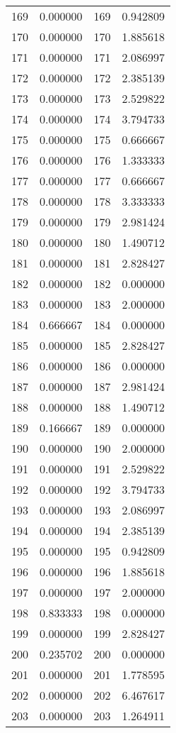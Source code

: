 \documentclass[12pt]{article}
\begin{document}
\begin{longtable}{@{}cccc@{}}
169 & 0.000000 & 169 & 0.942809 \\
170 & 0.000000 & 170 & 1.885618 \\
171 & 0.000000 & 171 & 2.086997 \\
172 & 0.000000 & 172 & 2.385139 \\
173 & 0.000000 & 173 & 2.529822 \\
174 & 0.000000 & 174 & 3.794733 \\
175 & 0.000000 & 175 & 0.666667 \\
176 & 0.000000 & 176 & 1.333333 \\
177 & 0.000000 & 177 & 0.666667 \\
178 & 0.000000 & 178 & 3.333333 \\
179 & 0.000000 & 179 & 2.981424 \\
180 & 0.000000 & 180 & 1.490712 \\
181 & 0.000000 & 181 & 2.828427 \\
182 & 0.000000 & 182 & 0.000000 \\
183 & 0.000000 & 183 & 2.000000 \\
184 & 0.666667 & 184 & 0.000000 \\
185 & 0.000000 & 185 & 2.828427 \\
186 & 0.000000 & 186 & 0.000000 \\
187 & 0.000000 & 187 & 2.981424 \\
188 & 0.000000 & 188 & 1.490712 \\
189 & 0.166667 & 189 & 0.000000 \\
190 & 0.000000 & 190 & 2.000000 \\
191 & 0.000000 & 191 & 2.529822 \\
192 & 0.000000 & 192 & 3.794733 \\
193 & 0.000000 & 193 & 2.086997 \\
194 & 0.000000 & 194 & 2.385139 \\
195 & 0.000000 & 195 & 0.942809 \\
196 & 0.000000 & 196 & 1.885618 \\
197 & 0.000000 & 197 & 2.000000 \\
198 & 0.833333 & 198 & 0.000000 \\
199 & 0.000000 & 199 & 2.828427 \\
200 & 0.235702 & 200 & 0.000000 \\
201 & 0.000000 & 201 & 1.778595 \\
202 & 0.000000 & 202 & 6.467617 \\
203 & 0.000000 & 203 & 1.264911 \\

\end{longtable}
\end{document}
